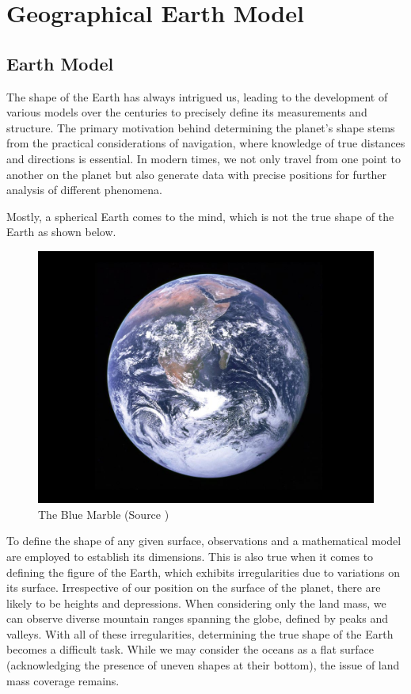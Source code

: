 

\section{Geographical Earth Model}

\subsection{Earth Model}

The shape of the Earth has always intrigued us, leading to the development of various models over the centuries to precisely define its measurements and structure.
The primary motivation behind determining the planet's shape stems from the practical considerations of navigation, where knowledge of true distances and directions is essential.
In modern times, we not only travel from one point to another on the planet but also generate data with precise positions for further analysis of different phenomena.


Mostly, a spherical Earth comes to the mind, which is not the true shape of the Earth as shown below.

\begin{figure}[h]
    \centering
    \includegraphics[width=0.5\linewidth]{figures/chapter-2/earth.jpg}
    \caption{The Blue Marble (Source \cite{EARTH_IMAGE}) }
    \label{fig:earth}
\end{figure}


To define the shape of any given surface, observations and a mathematical model are employed to establish its dimensions.
This is also true when it comes to defining the figure of the Earth, which exhibits irregularities due to variations on its surface.
Irrespective of our position on the surface of the planet, there are likely to be heights and depressions. When considering only the land mass, we can observe diverse mountain ranges spanning the globe, defined by peaks and valleys.
With all of these irregularities, determining the true shape of the Earth becomes a difficult task.
While we may consider the oceans as a flat surface (acknowledging the presence of uneven shapes at their bottom), the issue of land mass coverage remains.

